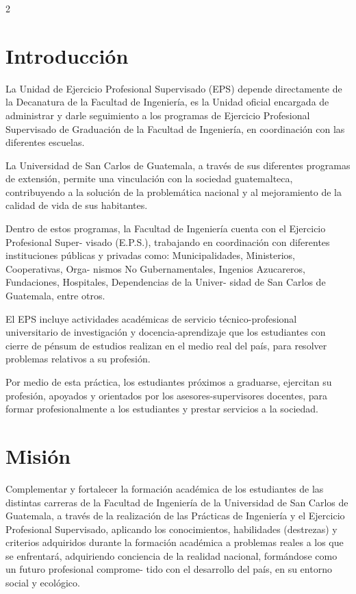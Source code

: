 \documentclass[12pt,spanish,Letterpaper,openany]{book}
\begin{document}
\begin {multicols}{2}

\hypertarget{introducciuxf3n}{%
\section*{Introducción}\label{introducciuxf3n}}

La Unidad de Ejercicio Profesional Supervisado (EPS) depende directamente de la Decanatura de la Facultad de Ingeniería, es la Unidad oficial encargada de administrar y darle seguimiento a los programas de Ejercicio Profesional Supervisado de Graduación de la Facultad de Ingeniería, en coordinación con las diferentes escuelas.

La Universidad de San Carlos de Guatemala, a través de sus diferentes programas de extensión, permite una vinculación con la sociedad guatemalteca, contribuyendo a la solución de la problemática nacional y al mejoramiento de la calidad de vida de sus habitantes.

Dentro de estos programas, la Facultad de Ingeniería cuenta con el Ejercicio Profesional Super-
visado (E.P.S.), trabajando en coordinación con diferentes instituciones públicas y privadas como: Municipalidades, Ministerios, Cooperativas, Orga-
nismos No Gubernamentales, Ingenios Azucareros, Fundaciones, Hospitales, Dependencias de la Univer-
sidad de San Carlos de Guatemala, entre otros.

El EPS incluye actividades académicas de servicio técnico-profesional universitario de investigación y docencia-aprendizaje que los estudiantes con cierre de pénsum de estudios realizan en el medio real del país, para resolver problemas relativos a su profesión.

Por medio de esta práctica, los estudiantes próximos a graduarse, ejercitan su profesión, apoyados y orientados por los asesores-supervisores docentes, para formar profesionalmente a los estudiantes y prestar servicios a la sociedad.

\hypertarget{misiuxf3n}{%
\section*{Misión}\label{misiuxf3n}}

Complementar y fortalecer la formación académica de los estudiantes de las distintas carreras de la Facultad de Ingeniería de la Universidad de San Carlos de Guatemala, a través de la realización de las Prácticas de Ingeniería y el Ejercicio Profesional Supervisado, aplicando los conocimientos, habilidades (destrezas) y criterios adquiridos durante la formación académica a problemas reales a los que se enfrentará, adquiriendo conciencia de la realidad nacional, formándose como un futuro profesional comprome-
tido con el desarrollo del país, en su entorno social y ecológico.


\end{multicols}
\end{document}
